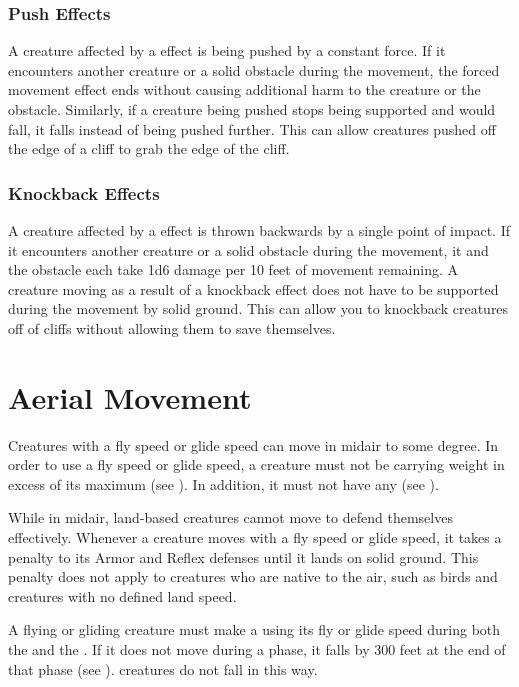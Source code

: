         \subsubsection{Push Effects}\label{Push Effects}
            A creature affected by a  effect is being pushed by a constant force.
            If it encounters another creature or a solid obstacle during the movement, the forced movement effect ends without causing additional harm to the creature or the obstacle.
            Similarly, if a creature being pushed stops being supported and would fall, it falls instead of being pushed further.
            This can allow creatures pushed off the edge of a cliff to grab the edge of the cliff.

        \subsubsection{Knockback Effects}\label{Knockback Effects}
            A creature affected by a  effect is thrown backwards by a single point of impact.
            If it encounters another creature or a solid obstacle during the movement, it and the obstacle each take 1d6 damage per 10 feet of movement remaining.
            A creature moving as a result of a knockback effect does not have to be supported during the movement by solid ground.
            This can allow you to knockback creatures off of cliffs without allowing them to save themselves.

\section{Aerial Movement}\label{Aerial Movement}
    Creatures with a fly speed or glide speed can move in midair to some degree.
    In order to use a fly speed or glide speed, a creature must not be carrying weight in excess of its maximum  (see ).
    In addition, it must not have any  (see ).

    While in midair, land-based creatures cannot move to defend themselves effectively.
    Whenever a creature moves with a fly speed or glide speed, it takes a  penalty to its Armor and Reflex defenses until it lands on solid ground.
    This penalty does not apply to creatures who are native to the air, such as birds and creatures with no defined land speed.

    A flying or gliding creature must make a  using its fly or glide speed during both the  and the .
    If it does not move during a phase, it falls by 300 feet at the end of that phase (see ).
     creatures do not fall in this way.

